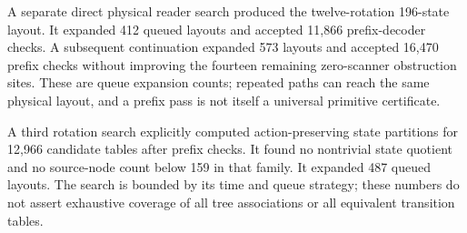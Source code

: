 A separate direct physical reader search produced the twelve-rotation
196-state layout. It expanded 412 queued layouts and accepted 11,866
prefix-decoder checks. A subsequent continuation expanded 573 layouts
and accepted 16,470 prefix checks without improving the fourteen
remaining zero-scanner obstruction sites. These are queue expansion
counts; repeated paths can reach the same physical layout, and a prefix
pass is not itself a universal primitive certificate.

A third rotation search explicitly computed action-preserving state
partitions for 12,966 candidate tables after prefix checks. It found
no nontrivial state quotient and no source-node count below 159 in that
family. It expanded 487 queued layouts. The search is bounded by its
time and queue strategy; these numbers do not assert exhaustive coverage
of all tree associations or all equivalent transition tables.


